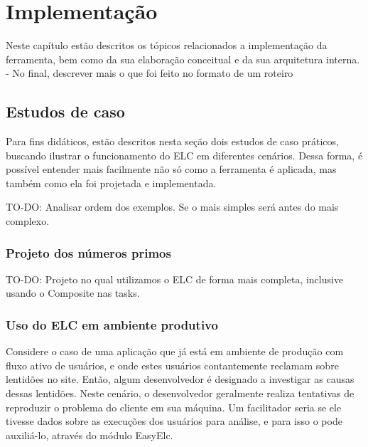 \documentclass[12pt]{tcc}
\begin{document}
		

	

\chapter{Implementação}
\label{cap:implementação}

Neste capítulo estão descritos os tópicos relacionados a implementação da ferramenta, bem como da sua elaboração conceitual e da sua arquitetura interna. - No final, descrever mais o que foi feito no formato de um roteiro

\section{Estudos de caso}

Para fins didáticos, estão descritos nesta seção dois estudos de caso práticos, buscando ilustrar o funcionamento do ELC em diferentes cenários. Dessa forma, é possível entender mais facilmente não só como a ferramenta é aplicada, mas também como ela foi projetada e implementada.

TO-DO: Analisar ordem dos exemplos. Se o mais simples será antes do mais complexo.

\subsection{Projeto dos números primos}

TO-DO: Projeto no qual utilizamos o ELC de forma mais completa, inclusive usando o Composite nas tasks.


\subsection{Uso do ELC em ambiente produtivo}
\label{subsection:exemplo-elc-prod}

Considere o caso de uma aplicação que já está em ambiente de produção com fluxo ativo de usuários, e onde estes usuários contantemente reclamam sobre lentidões no site.
Então, algum desenvolvedor é designado a investigar as causas dessas lentidões.
Neste cenário, o desenvolvedor geralmente realiza tentativas de reproduzir o problema do cliente em sua máquina. Um facilitador seria se ele tivesse dados sobre as execuções dos usuários para análise, e para isso o  pode auxiliá-lo, através do módulo EasyElc.
\end{document}
